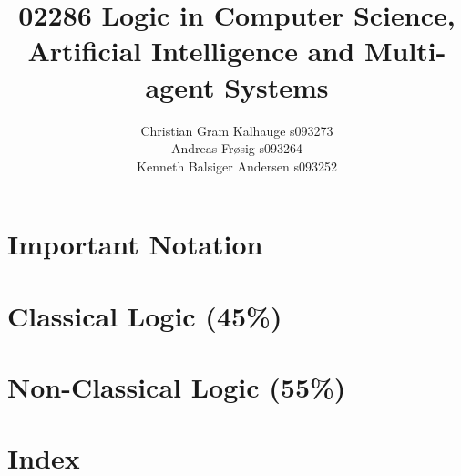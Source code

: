 \documentclass[a4paper,11pt]{article}
\title{02286 Logic in Computer Science, Artificial Intelligence and Multi-agent Systems }
\author{
Christian Gram Kalhauge s093273 \\
Andreas Frøsig s093264 \\
Kenneth Balsiger Andersen s093252
}
\begin{document}
\maketitle

\part{Important Notation}



\part{Classical Logic (45\%)}




\part{Non-Classical Logic (55\%)}


\part{Index}

\printindex


\nocite{*}



\end{document}
